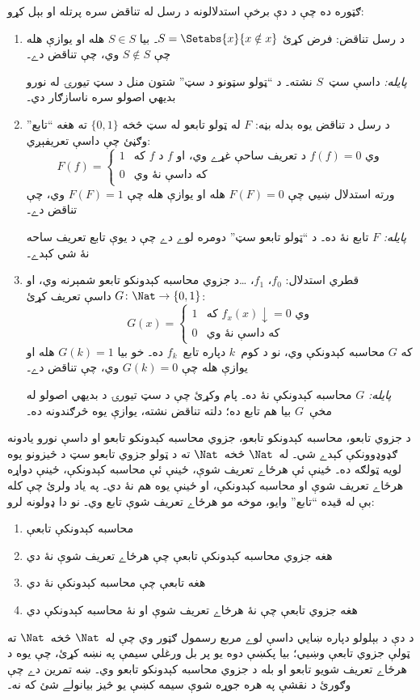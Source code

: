 \documentclass[../../../include/open-logic-section]{subfiles}
\begin{document}

ګټوره ده چې د دې برخې استدلالونه د رسل له تناقض سره پرتله او بېل
کړو:
\begin{enumerate}
\item د رسل تناقض: فرض کړئ $S = \Setabs{x}{x \notin x}$۔ بيا $S
  \in S$ هله او يوازې هله چې $S \notin S$ وي، چې تناقض دے۔

  \emph{پايله:} داسې سټ~$S$ نشته۔ د ``ټولو سټونو د سټ'' شتون منل د
  سټ تيورۍ له نورو بديهي اصولو سره ناسازګار دي۔

\item د رسل د تناقض يوه بدله بڼه: $F$ له ټولو تابعو له سټ څخه
  $\{ 0, 1 \}$ ته هغه ``تابع'' وګڼئ چې داسې تعريفېږي:
  \[
  F(f) =
  \begin{cases}
    1 & \text{که $f$ د~$f$ د تعريف ساحې غړے وي، او $f(f) = 0$ وي} \\
    0 & \text{که داسې نۀ وي}
  \end{cases}
  \]
  ورته استدلال ښيي چې $F(F) = 0$ هله او يوازې هله چې $F(F) = 1$
  وي، چې تناقض دے۔

  \emph{پايله:} $F$ تابع نۀ ده۔ د ``ټولو تابعو سټ'' دومره لوے دے
  چې د يوې تابع تعريف ساحه نۀ شي کېدے۔

\item قطري استدلال: $f_0$، $f_1$، \dots د جزوي محاسبه کېدونکو تابعو
  شمېرنه وي، او $G \colon \Nat \to \{ 0, 1 \}$ داسې تعريف کړئ:
  \[
  G(x) =
  \begin{cases}
    1 & \text{که $f_x(x)\downarrow = 0$ وي} \\
    0 & \text{که داسې نۀ وي}
  \end{cases}
  \]
  که $G$ محاسبه کېدونکې وي، نو د کوم~$k$ دپاره تابع~$f_k$ ده۔ خو
  بيا $G(k) = 1$ هله او يوازې هله چې $G(k) = 0$ وي، چې تناقض دے۔

  \emph{پايله:} $G$ محاسبه کېدونکې نۀ ده۔ پام وکړئ چې د سټ تيورۍ د
  بديهي اصولو له مخې~$G$ بيا هم تابع ده؛ دلته تناقض نشته، يوازې يوه
  څرګندونه ده۔
\end{enumerate}

د جزوي تابعو، محاسبه کېدونکو تابعو، جزوي محاسبه کېدونکو تابعو او
داسې نورو يادونه ګډوډوونکې کېدے شي۔ له~$\Nat$ څخه~$\Nat$ ته د ټولو
جزوي تابعو سټ د څيزونو يوه لويه ټولګه ده۔ ځينې ئې هرځاے تعريف شوې،
ځينې ئې محاسبه کېدونکې، ځينې دواړه هرځاے تعريف شوې او محاسبه
کېدونکې، او ځينې يوه هم نۀ دي۔ په ياد ولرئ چې کله بې له قيده
``تابع'' وايو، موخه مو هرځاے تعريف شوې تابع وي۔ نو دا ډولونه لرو:
\begin{enumerate}
\item محاسبه کېدونکې تابعې
\item هغه جزوي محاسبه کېدونکې تابعې چې هرځاے تعريف شوې نۀ دي
\item هغه تابعې چې محاسبه کېدونکې نۀ دي
\item هغه جزوي تابعې چې نۀ هرځاے تعريف شوې او نۀ محاسبه کېدونکې دي
\end{enumerate}
د دې د بېلولو دپاره ښايي داسې لوے مربع رسمول ګټور وي چې له~$\Nat$
څخه~$\Nat$ ته ټولې جزوي تابعې وښيي؛ بيا پکښې دوه يو پر بل ورغلي
سيمې په نښه کړئ، چې يوه د هرځاے تعريف شويو تابعو او بله د جزوي
محاسبه کېدونکو تابعو وي۔ ښه تمرين دے چې وګورئ د نقشې په هره جوړه شوې
سيمه کښې يو څيز بيانولے شئ که نه۔
\end{document}
